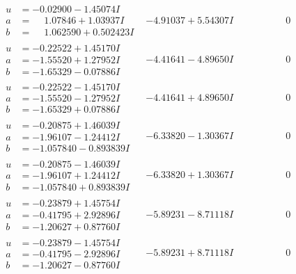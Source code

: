 \documentclass[1p]{elsarticle_modified}
\theoremstyle{definition}
\begin{document}
$$\begin{array}{c|c|c}
\begin{aligned}
u &= -0.02900 - 1.45074 I \\
a &= \phantom{-}1.07846 + 1.03937 I \\
b &= \phantom{-}1.062590 + 0.502423 I\end{aligned}
 & -4.91037 + 5.54307 I & \phantom{-0.000000 } 0 \\ \hline\begin{aligned}
u &= -0.22522 + 1.45170 I \\
a &= -1.55520 + 1.27952 I \\
b &= -1.65329 - 0.07886 I\end{aligned}
 & -4.41641 - 4.89650 I & \phantom{-0.000000 } 0 \\ \hline\begin{aligned}
u &= -0.22522 - 1.45170 I \\
a &= -1.55520 - 1.27952 I \\
b &= -1.65329 + 0.07886 I\end{aligned}
 & -4.41641 + 4.89650 I & \phantom{-0.000000 } 0 \\ \hline\begin{aligned}
u &= -0.20875 + 1.46039 I \\
a &= -1.96107 - 1.24412 I \\
b &= -1.057840 - 0.893839 I\end{aligned}
 & -6.33820 - 1.30367 I & \phantom{-0.000000 } 0 \\ \hline\begin{aligned}
u &= -0.20875 - 1.46039 I \\
a &= -1.96107 + 1.24412 I \\
b &= -1.057840 + 0.893839 I\end{aligned}
 & -6.33820 + 1.30367 I & \phantom{-0.000000 } 0 \\ \hline\begin{aligned}
u &= -0.23879 + 1.45754 I \\
a &= -0.41795 + 2.92896 I \\
b &= -1.20627 + 0.87760 I\end{aligned}
 & -5.89231 - 8.71118 I & \phantom{-0.000000 } 0 \\ \hline\begin{aligned}
u &= -0.23879 - 1.45754 I \\
a &= -0.41795 - 2.92896 I \\
b &= -1.20627 - 0.87760 I\end{aligned}
 & -5.89231 + 8.71118 I & \phantom{-0.000000 } 0 \\ \hline\begin{aligned}

\end{aligned}
\end{array}$$
\end{document}
